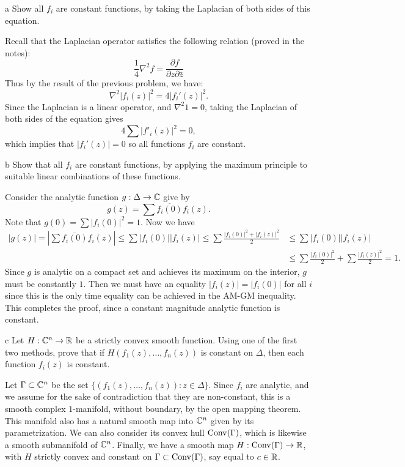 \documentclass{pset}
\begin{document}
\begin{parts}
    \begin{part}{a}
        Show all $f_i$ are constant functions, by taking the Laplacian of both sides of this equation.
    \end{part}

    Recall that the Laplacian operator satisfies the following relation (proved in the notes):
    \[
        \frac{1}{4}\nabla^2f = \frac{\partial f}{\partial z\partial\bar{z}}
    \]
    Thus by the result of the previous problem, we have:
    \[
        \nabla^2 |f_i(z)|^2 = 4|f_i'(z)|^2
    .\]  
    Since the Laplacian is a linear operator, and $\nabla^2 1= 0$, taking the Laplacian of both sides of the equation gives
    \[
        4\sum |f'_i(z)|^2 = 0,
    \] 
    which implies that $|f_i'(z)|=0$ so all functions $f_i$ are constant.


    \begin{part}{b}
        Show that all $f_i$ are constant functions, by applying the maximum principle to suitable linear combinations of these functions.
    \end{part}

    Consider the analytic function $g : \Delta \to \mathbb{C}$ give by
    \[
        g(z)=\sum \overline{f_i(0)}f_i(z)
    .\] 
    Note that $g(0)=\sum |f_i(0)|^2=1$. Now we have
    \[
        \begin{aligned}
            |g(z)| = \left|\sum \overline{f_i(0)}f_i(z)\right|\leq \sum |f_i(0)||f_i(z)|\leq \sum \frac{|f_i(0)|^2+|f_i(z)|^2}{2}&\leq \sum |f_i(0)||f_i(z)|\\
            &\leq \sum \frac{|f_i(0)|^2}{2}+\sum\frac{|f_i(z)|^2}{2} =1.
        \end{aligned}
    \]
    Since $g$ is analytic on a compact set and achieves its maximum on the interior, $g$ must be constantly $1$. Then we must have an equality $|f_i(z)|=|f_i(0)|$ for all $i$ since this is the only time equality can be achieved in the AM-GM inequality. This completes the proof, since a constant magnitude analytic function is constant.

    \begin{part}{c}
        Let $H: \mathbb{C}^n \to \mathbb{R}$ be a strictly convex smooth function. Using one of the first two methods, prove that if $H(f_1(z),\ldots,f_n(z))$ is constant on $\Delta$, then each function $f_i(z)$ is constant.
    \end{part}

    Let $\Gamma \subset \mathbb{C}^n$ be the set $\{(f_1(z), \ldots, f_n(z)) : z\in \Delta\}$. Since $f_i$ are analytic, and we assume for the sake of contradiction that they are non-constant, this is a smooth complex $1$-manifold, without boundary, by the open mapping theorem. This manifold also has a natural smooth map into $\mathbb{C}^n$ given by its parametrization. We can also consider its convex hull $\textrm{Conv}(\Gamma)$, which is likewise a smooth submanifold of $\mathbb{C}^n$. Finally, we have a smooth map $H : \textrm{Conv}(\Gamma) \to \mathbb{R}$, with $H$ strictly convex and constant on $\Gamma \subset \textrm{Conv}(\Gamma)$, say equal to $c\in \mathbb{R}$.


\end{parts}
\end{document}
